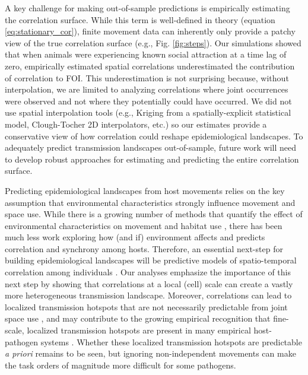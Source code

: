 \documentclass[letterpaper]{article}
\begin{document}
A key challenge for making out-of-sample predictions is empirically estimating the correlation surface.  While this term is well-defined in theory (equation \ref{eq:stationary_cor}), finite movement data can inherently only provide a patchy view of the true correlation surface (e.g., Fig. \ref{fig:steps}).  Our simulations showed that when animals were experiencing known social attraction at a time lag of zero, empirically estimated spatial correlations underestimated the contribution of correlation to FOI. This underestimation is not surprising because, without interpolation, we are limited to analyzing correlations where joint occurrences were observed and not where they potentially could have occurred. We did not use spatial interpolation tools (e.g., Kriging from a spatially-explicit statistical model, Clough-Tocher 2D interpolators, etc.) so our estimates provide a conservative view of how correlation could reshape epidemiological landscapes.  To adequately predict transmission landscapes out-of-sample, future work will need to develop robust approaches for estimating and predicting the entire correlation surface. 

Predicting epidemiological landscapes from host movements relies on the key assumption that environmental characteristics strongly influence movement and space use. While there is a growing number of methods that quantify the effect of environmental characteristics on movement and habitat use \citep[reviewed in][]{Hooten2017a}, there has been much less work exploring how (and if) environment affects and predicts correlation and synchrony among hosts.  Therefore, an essential next-step for building epidemiological landscapes will be predictive models of spatio-temporal correlation among individuals \citep[e.g.][]{Brandell2021}.
Our analyses emphasize the importance of this next step by showing that correlations at a local (cell) scale can create a vastly more heterogeneous transmission landscape. Moreover, correlations can lead to localized transmission hotspots that are not necessarily predictable from joint space use \citep{Yang2023a}, and may contribute to the growing empirical recognition that fine-scale, localized transmission hotspots are present in many empirical host-pathogen systems \citep{Albery2021}.  Whether these localized transmission hotspots are predictable \emph{a priori} remains to be seen, but ignoring non-independent movements can make the task orders of magnitude more difficult for some pathogens.



\end{document}
